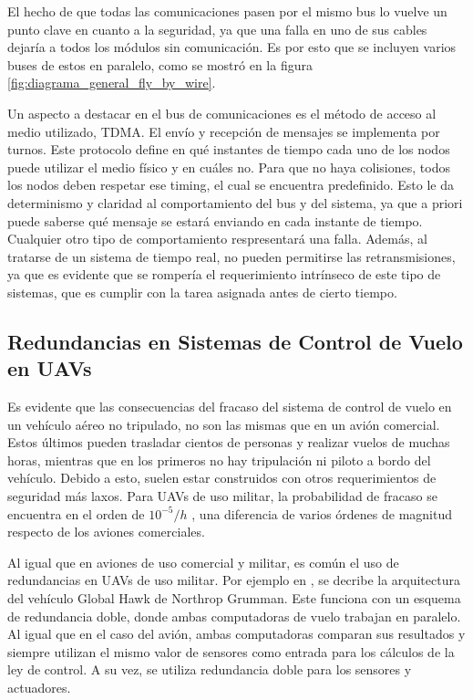 El hecho de que todas las comunicaciones pasen por el mismo bus lo vuelve un punto clave en cuanto a la seguridad, ya que una falla en uno de sus cables dejaría a todos los módulos sin comunicación. Es por esto que se incluyen varios buses de estos en paralelo, como se mostró en la figura \ref{fig:diagrama_general_fly_by_wire}.

Un aspecto a destacar en el bus de comunicaciones es el método de acceso al medio utilizado, TDMA. El envío y recepción de mensajes se implementa por turnos. Este protocolo define en qué instantes de tiempo cada uno de los nodos puede utilizar el medio físico y en cuáles no. Para que no haya colisiones, todos los nodos deben respetar ese timing, el cual se encuentra predefinido. Esto le da determinismo y claridad al comportamiento del bus y del sistema, ya que a priori puede saberse qué mensaje se estará enviando en cada instante de tiempo. Cualquier otro tipo de comportamiento respresentará una falla. Además, al tratarse de un sistema de tiempo real, no pueden permitirse las retransmisiones, ya que es evidente que se rompería el requerimiento intrínseco de este tipo de sistemas, que es cumplir con la tarea asignada antes de cierto tiempo.



\subsection{Redundancias en Sistemas de Control de Vuelo en UAVs}

Es evidente que las consecuencias del fracaso del sistema de control de vuelo en un vehículo aéreo no tripulado, no son las mismas que en un avión comercial. Estos últimos pueden trasladar cientos de personas y realizar vuelos de muchas horas, mientras que en los primeros no hay tripulación ni piloto a bordo del vehículo. Debido a esto, suelen estar construidos con otros requerimientos de seguridad más laxos. Para UAVs de uso militar, la probabilidad de fracaso se encuentra en el orden de $10^{-5} / h$ \cite{zhang2020architecture}\cite[p.~491]{collinson2023introduction}, una diferencia de varios órdenes de magnitud respecto de los aviones comerciales.

Al igual que en aviones de uso comercial y militar, es común el uso de redundancias en UAVs de uso militar. Por ejemplo en \cite{821966}, se decribe la arquitectura del vehículo Global Hawk de Northrop Grumman. Este funciona con un esquema de redundancia doble, donde ambas computadoras de vuelo trabajan en paralelo. Al igual que en el caso del avión, ambas computadoras comparan sus resultados y siempre utilizan el mismo valor de sensores como entrada para los cálculos de la ley de control. A su vez, se utiliza redundancia doble para los sensores y actuadores.

